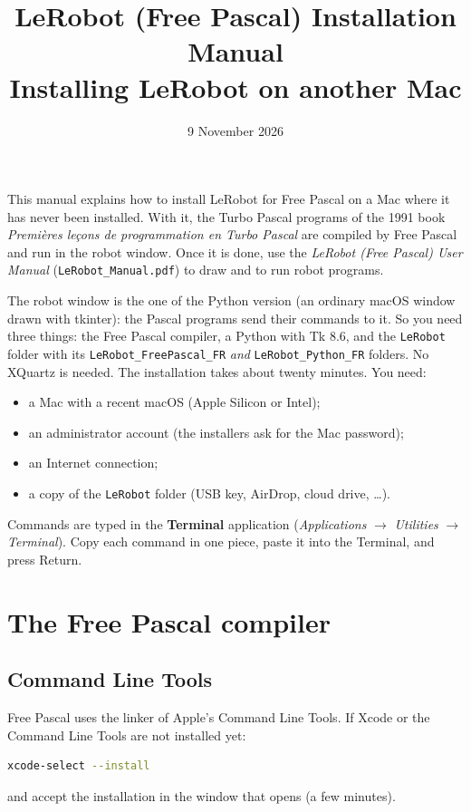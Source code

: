 \documentclass[11pt,a4paper]{article}
\title{LeRobot (Free Pascal) Installation Manual\\[0.3em]\large Installing LeRobot on another Mac}
\author{}
\date{9 November 2026}
\newcommand{\kbd}[1]{\texttt{#1}}
\begin{document}
\maketitle

This manual explains how to install LeRobot for Free Pascal on a Mac where
it has never been installed. With it, the Turbo Pascal programs of the 1991
book \emph{Premières leçons de programmation en Turbo Pascal} are compiled
by Free Pascal and run in the robot window. Once it is done, use the
\emph{LeRobot (Free Pascal) User Manual} (\kbd{LeRobot\_Manual.pdf}) to draw
and to run robot programs.

The robot window is the one of the Python version (an ordinary macOS window
drawn with tkinter): the Pascal programs send their commands to it. So you
need three things: the Free Pascal compiler, a Python with Tk 8.6, and the
\kbd{LeRobot} folder with its \kbd{LeRobot\_FreePascal\_FR} \emph{and}
\kbd{LeRobot\_Python\_FR} folders. No XQuartz is needed. The installation takes
about twenty minutes. You need:
\begin{itemize}
\item a Mac with a recent macOS (Apple Silicon or Intel);
\item an administrator account (the installers ask for the Mac password);
\item an Internet connection;
\item a copy of the \kbd{LeRobot} folder (USB key, AirDrop, cloud drive,
  \dots).
\end{itemize}

Commands are typed in the \textbf{Terminal} application
(\emph{Applications} $\rightarrow$ \emph{Utilities} $\rightarrow$
\emph{Terminal}). Copy each command in one piece, paste it into the
Terminal, and press Return.

\tableofcontents

\section{The Free Pascal compiler}

\subsection{Command Line Tools}
Free Pascal uses the linker of Apple's Command Line Tools. If Xcode or the
Command Line Tools are not installed yet:
\begin{lstlisting}[language=bash]
xcode-select --install
\end{lstlisting}
and accept the installation in the window that opens (a few minutes).
\end{document}
